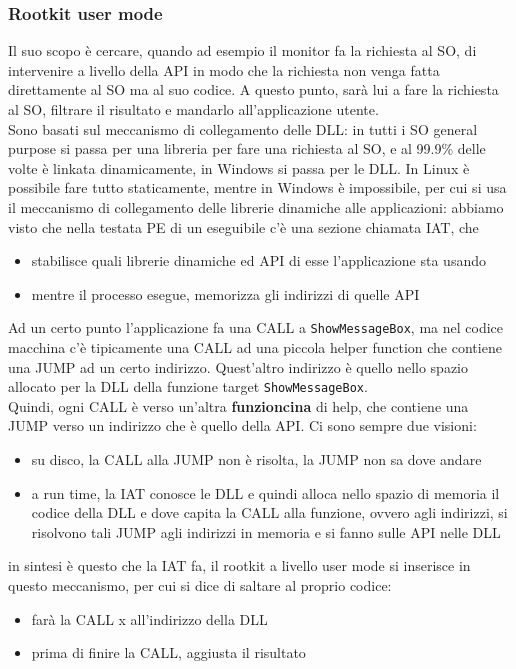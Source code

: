 \documentclass[12pt, oneside]{extbook}
\begin{document}
\subsubsection{Rootkit user mode}
Il suo scopo è cercare, quando ad esempio il monitor fa la richiesta al SO, di intervenire a livello della API in modo che la richiesta non venga fatta direttamente al SO ma al suo codice. A questo punto, sarà lui a fare la richiesta al SO, filtrare il risultato e mandarlo all'applicazione utente.\\Sono basati sul meccanismo di collegamento delle DLL: in tutti i SO general purpose si passa per una libreria per fare una richiesta al SO, e al 99.9\% delle volte è linkata dinamicamente, in Windows si passa per le DLL. In Linux è possibile fare tutto staticamente, mentre in Windows è impossibile, per cui si usa il meccanismo di collegamento delle librerie dinamiche alle applicazioni: abbiamo visto che nella testata PE di un eseguibile c'è una sezione chiamata IAT, che
\begin{itemize}
	\item stabilisce quali librerie dinamiche ed API di esse l'applicazione sta usando
	\item mentre il processo esegue, memorizza gli indirizzi di quelle API
\end{itemize}
Ad un certo punto l'applicazione fa una CALL a \texttt{ShowMessageBox}, ma nel codice macchina c'è tipicamente una CALL ad una piccola helper function che contiene una JUMP ad un certo indirizzo. Quest'altro indirizzo è quello nello spazio allocato per la DLL della funzione target \texttt{ShowMessageBox}.\\Quindi, ogni CALL è verso un'altra \textbf{\textsf{funzioncina}} di help, che contiene una JUMP verso un indirizzo che è quello della API. Ci sono sempre due visioni:
\begin{itemize}
	\item su disco, la CALL alla JUMP non è risolta, la JUMP non sa dove andare
	\item a run time, la IAT conosce le DLL e quindi alloca nello spazio di memoria il codice della DLL e dove capita la CALL alla funzione, ovvero agli indirizzi, si risolvono tali JUMP agli indirizzi in memoria e si fanno sulle API nelle DLL
\end{itemize}
in sintesi è questo che la IAT fa, il rootkit a livello user mode si inserisce in questo meccanismo, per cui si dice di saltare al proprio codice:
\begin{itemize}
	\item farà la CALL x all'indirizzo della DLL
	\item prima di finire la CALL, aggiusta il risultato
\end{itemize}
\end{document}
